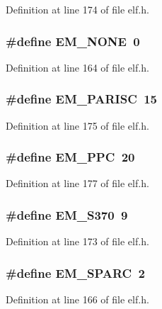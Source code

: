 Definition at line 174 of file elf.h.
\subsubsection[{EM\_\-NONE}]{\setlength{\rightskip}{0pt plus 5cm}\#define EM\_\-NONE~0}\label{elf_8h_5a14b1234094272355977c59e351a14f}




Definition at line 164 of file elf.h.
\subsubsection[{EM\_\-PARISC}]{\setlength{\rightskip}{0pt plus 5cm}\#define EM\_\-PARISC~15}\label{elf_8h_81190acbe6100558ef494d752aa42e7d}




Definition at line 175 of file elf.h.
\subsubsection[{EM\_\-PPC}]{\setlength{\rightskip}{0pt plus 5cm}\#define EM\_\-PPC~20}\label{elf_8h_ceec29f8bf25eff4c55932933a68dcae}




Definition at line 177 of file elf.h.
\subsubsection[{EM\_\-S370}]{\setlength{\rightskip}{0pt plus 5cm}\#define EM\_\-S370~9}\label{elf_8h_7d5aebf469008b18be87985186eed899}




Definition at line 173 of file elf.h.
\subsubsection[{EM\_\-SPARC}]{\setlength{\rightskip}{0pt plus 5cm}\#define EM\_\-SPARC~2}\label{elf_8h_3d33cb376c76e9fb077ddf5389f8f8b8}




Definition at line 166 of file elf.h.
